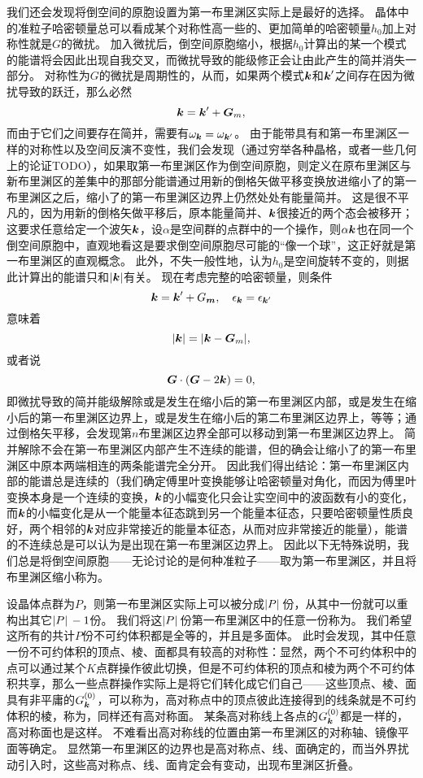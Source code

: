 我们还会发现将倒空间的原胞设置为第一布里渊区实际上是最好的选择。
晶体中的准粒子哈密顿量总可以看成某个对称性高一些的、更加简单的哈密顿量$h_0$加上对称性就是$G$的微扰。
加入微扰后，倒空间原胞缩小，根据$h_0$计算出的某一个模式的能谱将会因此出现自我交叉，而微扰导致的能级修正会让由此产生的简并消失一部分。
对称性为$G$的微扰是周期性的，从而，如果两个模式$\vb*{k}$和$\vb*{k}'$之间存在因为微扰导致的跃迁，那么必然
\[
    \vb*{k} = \vb*{k}' + \vb*{G}_m,
\]
而由于它们之间要存在简并，需要有$\omega_{\vb*{k}} = \omega_{\vb*{k}'}$。
由于能带具有和第一布里渊区一样的对称性以及空间反演不变性，我们会发现（通过穷举各种晶格，或者一些几何上的论证TODO），如果取第一布里渊区作为倒空间原胞，则定义在原布里渊区与新布里渊区的差集中的那部分能谱通过用新的倒格矢做平移变换放进缩小了的第一布里渊区之后，缩小了的第一布里渊区边界上仍然处处有能量简并。
这是很不平凡的，因为用新的倒格矢做平移后，原本能量简并、$\vb*{k}$很接近的两个态会被移开；这要求任意给定一个波矢$\vb*{k}$，设$\alpha$是空间群的点群中的一个操作，则$\alpha \vb*{k}$也在同一个倒空间原胞中，直观地看这是要求倒空间原胞尽可能的“像一个球”，这正好就是第一布里渊区的直观概念。
此外，不失一般性地，认为$h_0$是空间旋转不变的，则据此计算出的能谱只和$\abs{\vb*{k}}$有关。
现在考虑完整的哈密顿量，则条件
\[
    \vb*{k} = \vb*{k}' + G_{\vb*{m}}, \quad \epsilon_{\vb*{k}} = \epsilon_{\vb*{k}'}
\]
意味着
\[
    \abs{\vb*{k}} = \abs{\vb*{k} - \vb*{G}_m},
\]
或者说
\[
    \vb*{G} \cdot (\vb*{G} - 2 \vb*{k}) = 0,
\]
即微扰导致的简并能级解除或是发生在缩小后的第一布里渊区内部，或是发生在缩小后的第一布里渊区边界上，或是发生在缩小后的第二布里渊区边界上，等等；通过倒格矢平移，会发现第$n$布里渊区边界全部可以移动到第一布里渊区边界上。
简并解除不会在第一布里渊区内部产生不连续的能谱，但的确会让缩小了的第一布里渊区中原本两端相连的两条能谱完全分开。
因此我们得出结论：第一布里渊区内部的能谱总是连续的（我们确定傅里叶变换能够让哈密顿量对角化，而因为傅里叶变换本身是一个连续的变换，$\vb*{k}$的小幅变化只会让实空间中的波函数有小的变化，而$\vb*{k}$的小幅变化是从一个能量本征态跳到另一个能量本征态，只要哈密顿量性质良好，两个相邻的$\vb*{k}$对应非常接近的能量本征态，从而对应非常接近的能量），能谱的不连续总是可以认为是出现在第一布里渊区边界上。
因此以下无特殊说明，我们总是将倒空间原胞——无论讨论的是何种准粒子——取为第一布里渊区，并且将布里渊区缩小称为。

设晶体点群为$P$，则第一布里渊区实际上可以被分成$\abs*{P}$份，从其中一份就可以重构出其它$\abs*{P} - 1$份。
我们将这$\abs*{P}$份第一布里渊区中的任意一份称为。
我们希望这所有的共计$P$份不可约体积都是全等的，并且是多面体。
此时会发现，其中任意一份不可约体积的顶点、棱、面都具有较高的对称性：显然，两个不可约体积中的点可以通过某个$K$点群操作彼此切换，但是不可约体积的顶点和棱为两个不可约体积共享，那么一些点群操作实际上是将它们转化成它们自己——这些顶点、棱、面具有非平庸的$G^{(0)}_{\vb*{k}}$，可以称为，高对称点中的顶点彼此连接得到的线条就是不可约体积的棱，称为，同样还有高对称面。
某条高对称线上各点的$G_{\vb*{k}}^{(0)}$都是一样的，高对称面也是这样。
不难看出高对称线的位置由第一布里渊区的对称轴、镜像平面等确定。
显然第一布里渊区的边界也是高对称点、线、面确定的，而当外界扰动引入时，这些高对称点、线、面肯定会有变动，出现布里渊区折叠。

